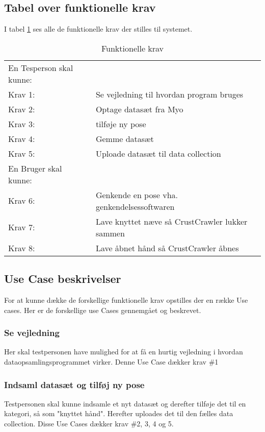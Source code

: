 \subsection*{Tabel over funktionelle krav}
I tabel \ref{tab:funktionellekrav} ses alle de funktionelle krav der stilles til systemet.
\bgroup
\def\arraystretch{1.8}
\begin{center}
	\begin{table}
		\begin{tabular}{lp{225pt}}
			\rowcolor{grey} En Tesperson skal kunne: &\\
			Krav 1:& Se vejledning til hvordan program bruges\\
			Krav 2:& Optage datasæt fra Myo\\
			Krav 3:& tilføje ny pose\\
			Krav 4:& Gemme datasæt\\
			Krav 5:& Uploade datasæt til data collection\\
			\rowcolor{grey}En Bruger skal kunne: &\\
			Krav 6:& Genkende en pose vha. genkendelsessoftwaren\\
			Krav 7:& Lave knyttet næve så CrustCrawler lukker sammen\\
			Krav 8:& Lave åbnet hånd så CrustCrawler åbnes
		\end{tabular}
		\caption{Funktionelle krav}
		\label{tab:funktionellekrav}
	\end{table}	
\end{center}
\egroup

\subsection*{Use Case beskrivelser}
For at kunne dække de forskellige funktionelle krav opstilles der en række Use cases. Her er de forskellige use Cases gennemgået og beskrevet.

\subsubsection{Se vejledning}
Her skal testpersonen have mulighed for at få en hurtig vejledning i hvordan dataopsamlingsprogrammet virker. Denne Use Case dækker krav \#1

\subsubsection{Indsaml datasæt og tilføj ny pose}
Testpersonen skal kunne indsamle et nyt datasæt og derefter tilføje det til en kategori, så som "knyttet hånd". Herefter uploades det til den fælles data collection. Disse Use Cases dækker krav \#2, 3, 4 og 5.
